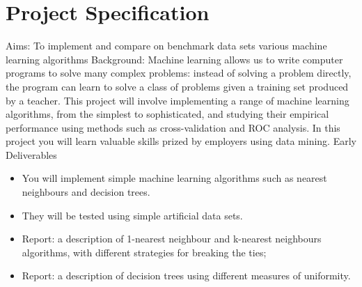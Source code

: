 \documentclass[]{final_report}
\begin{document}
\chapter*{Project Specification}

Aims: To implement and compare on benchmark data sets various machine learning algorithms
Background: Machine learning allows us to write computer programs to solve many complex problems: instead of solving a problem directly, the program can learn to solve a class of problems given a training set produced by a teacher. This project will involve implementing a range of machine learning algorithms, from the simplest to sophisticated, and studying their empirical performance using methods such as cross-validation and ROC analysis. In this project you will learn valuable skills prized by employers using data mining.
Early Deliverables

\begin{itemize}
  \item You will implement simple machine learning algorithms such as nearest neighbours and decision trees.
  \item They will be tested using simple artificial data sets.
  \item Report: a description of 1-nearest neighbour and k-nearest neighbours algorithms, with different strategies for breaking the ties;
  \item Report: a description of decision trees using different measures of uniformity.
\end{itemize}
\end{document}
